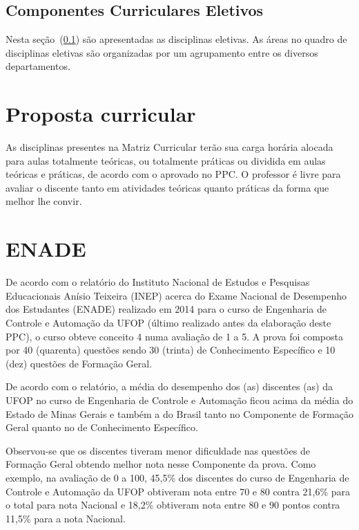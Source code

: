 \documentclass[
	12pt,				%
	openright,			%
	oneside,			%
	a4paper,			%
	english,			%
	brazil				%
	]{abntex2}
\begin{document}
\subsection{Componentes Curriculares Eletivos }\label{tab:0403}

Nesta seção~(\ref{tab:0403}) são apresentadas as disciplinas eletivas. As áreas no quadro de disciplinas eletivas são organizadas por um agrupamento entre os diversos departamentos.

 


\section{Proposta curricular}
As disciplinas presentes na Matriz Curricular terão sua carga horária alocada para aulas totalmente teóricas, ou totalmente práticas ou dividida em aulas teóricas e práticas, de acordo com o aprovado no PPC. O professor é livre para avaliar o discente tanto em atividades teóricas quanto práticas da forma que melhor lhe convir.

\section{ENADE}

De acordo com o relatório do Instituto Nacional de Estudos e Pesquisas Educacionais Anísio Teixeira (INEP) acerca do Exame Nacional de Desempenho dos Estudantes (ENADE) realizado em 2014 para o curso de Engenharia de Controle e Automação da UFOP (último realizado antes da elaboração deste PPC), o curso obteve conceito 4 numa avaliação de 1 a 5.  A prova foi composta por 40 (quarenta) questões sendo 30 (trinta) de Conhecimento Específico e 10 (dez) questões de Formação Geral.

De acordo com o relatório, a média do desempenho dos (as) discentes (as) da UFOP no curso de Engenharia de Controle e Automação ficou acima da média do Estado de Minas Gerais e também a do Brasil tanto no Componente de Formação Geral quanto no de Conhecimento Específico.

Observou-se que os discentes tiveram menor dificuldade nas questões de Formação Geral obtendo melhor nota nesse Componente da prova. Como exemplo, na avaliação de 0 a 100, 45,5\% dos discentes do curso de Engenharia de Controle e Automação da UFOP obtiveram nota entre 70 e 80 contra 21,6\% para o total para nota Nacional e 18,2\% obtiveram nota entre 80 e 90 pontos contra 11,5\% para a nota Nacional.
\end{document}

